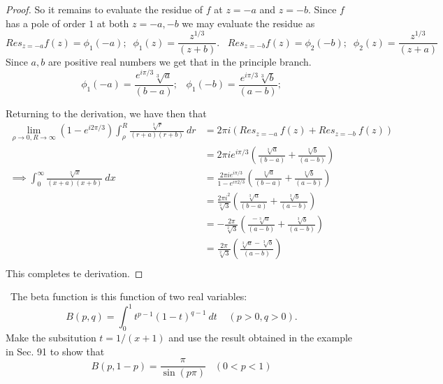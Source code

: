 \documentclass[11pt]{amsart}
\theoremstyle{definition}
\numberwithin{theorem}{section}
\numberwithin{definition}{section}
\numberwithin{equation}{section}
\newcommand{\parens}[1]{ \left( #1 \right) }
\begin{document}
\begin{proof}
	So it remains to evaluate the residue of $f$ at $z = -a$ and $z = - b$. Since $f$ has a
	pole of order $1$ at both $z= -a,-b$ we may evaluate the residue as
	\begin{equation*}
		Res_{z = -a} f(z) = \phi_1(-a);\;\; \phi_1(z) = \frac{z^{1/3}}{(z+b)}. \;\;\;Res_{z = -b} f(z) = \phi_2(-b);\;\; \phi_2(z) = \frac{z^{1/3}}{(z+a)}
	\end{equation*}
	Since $a, b$ are positive real numbers we get that in the principle branch.
	\begin{equation*}
	\phi_1(-a) = \frac{e^{i\pi/3}\sqrt[3]{a}}{(b-a)};\;\;\;\phi_1(-b) = \frac{e^{i\pi/3}\sqrt[3]{b}}{(a-b)};
	\end{equation*}

	Returning to the derivation, we have then that
	\begin{equation*}
	\begin{aligned}
		\lim_{\rho \to 0, R \to \infty}(1 - e^{i2\pi/3})\int_{\rho}^R \frac{\sqrt[3]{r}}{(r+a)(r+b)}\ dr  &=  2\pi i \parens{Res_{z = -a}\ f(z) +   Res_{z = -b}\ f(z)}  \\ 
		&=2\pi i e^{i\pi/3}\parens{\frac{\sqrt[3]{a}}{(b-a)} + \frac{\sqrt[3]{b}}{(a-b)} }  \\
		\implies	\int_{0}^\infty \frac{\sqrt[3]{x}}{(x+a)(x+b)}\ dx &= \frac{2\pi i e^{i\pi/3}}{1 - e^{i\pi2/3}} \parens{\frac{\sqrt[3]{a}}{(b-a)} + \frac{\sqrt[3]{b}}{(a-b)} }  \\
		&=\frac{2\pi i^2}{\sqrt[2]{3}} \parens{\frac{\sqrt[3]{a}}{(b-a)} + \frac{\sqrt[3]{b}}{(a-b)} }   \\
		&=-\frac{2\pi }{\sqrt[2]{3}} \parens{\frac{-\sqrt[3]{a}}{(a-b)} + \frac{\sqrt[3]{b}}{(a-b)} }  \\
		&=\frac{2\pi}{\sqrt[2]{3}} \parens{\frac{\sqrt[3]{a} - \sqrt[3]{b}}{(a-b)}  }  \\
	\end{aligned}
	\end{equation*} 
	This completes te derivation.
\end{proof}
\medskip {}\  The beta function is this function of two real variables:
\begin{equation*}
	B(p, q) = \int_0^1 t^{p-1}(1-t)^{q-1}\ dt\;\;\;\;(p > 0, q > 0).
\end{equation*}
Make the subsitution $t =1/(x+1)$ and use the result obtained in the example in Sec. 91
to show that
\begin{equation*}
	B(p, 1-p) = \frac{\pi}{\sin(p\pi)}\;\;\;(0 < p < 1)
\end{equation*}
\end{document}
